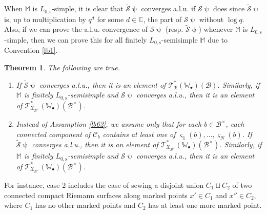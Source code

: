 \documentclass[11pt,b5paper,notitlepage]{article}
\theoremstyle{definition}
\theoremstyle{plain}
\newtheorem{thm}[df]{Theorem}
\newcommand{\fk}{\mathfrak}
\newcommand{\mc}{\mathcal}
\newcommand{\wtd}{\widetilde}
\newcommand{\scr}{\mathscr}
\newcommand{\sgm}{\varsigma}
\newcommand{\blt}{\bullet}
\newcommand{\Wbb}{\mathbb W}
\newcommand{\Mbb}{\mathbb M}
\newcommand{\Cbb}{\mathbb C}
\newcommand{\Lss}{{L_{0,\mathrm{s}}}}
\numberwithin{equation}{section}
\begin{document}
When $\Mbb$ is $\Lss$-simple, it is clear that $\wtd{\mc S}\uppsi$ converges a.l.u. if  $\mc S\uppsi$ does since $\wtd{\mc S}\uppsi$ is, up to multiplication by $q^d$ for some $d\in\Cbb$, the part of $\mc S\uppsi$ without $\log q$. Also, if we can prove the a.l.u. convergence of $\mc S\uppsi$ (resp. $\wtd{\mc S}\upphi$) whenever $\Mbb$ is $\Lss$-simple, then we can prove this for all finitely $\Lss$-semisimple $\Mbb$ due to Convention \ref{lb1}.


\begin{thm}\label{lb47}
The following are true.
\begin{enumerate}
\item  If  $\wtd{\mc S}\uppsi$  converges a.l.u., then it is an element  of $\scr T_{\fk X}^*(\Wbb_\blt)(\mc B)$. Similarly, if $\Mbb$ is finitely $\Lss$-semisimple and $\mc S\uppsi$ converges a.l.u., then it is an element of $\scr T_{\fk X_{\mc B^\times}}^*(\Wbb_\blt)(\mc B^\times)$.
\item Instead of Assumption \ref{lb62}, we assume only that for each $b\in\mc B^\times$, each connected component of $\mc C_b$ contains at least one of $\sgm_1(b),\dots,\sgm_N(b)$. If  $\wtd{\mc S}\uppsi$  converges a.l.u., then it is an element  of $\scr T_{\fk X_{\mc B^\times}}^*(\Wbb_\blt)(\mc B^\times)$. Similarly, if $\Mbb$ is finitely $\Lss$-semisimple and $\mc S\uppsi$ converges a.l.u., then it is an element of $\scr T_{\fk X_{\mc B^\times}}^*(\Wbb_\blt)(\mc B^\times)$.
\end{enumerate}
\end{thm}




For instance, case 2 includes the case of sewing a disjoint union $C_1\sqcup C_2$ of two connected compact Riemann surfaces along marked points $x'\in C_1$ and $x''\in C_2$, where $C_1$ has no other marked points and $C_2$ has at least one more marked point. 
\end{document}
